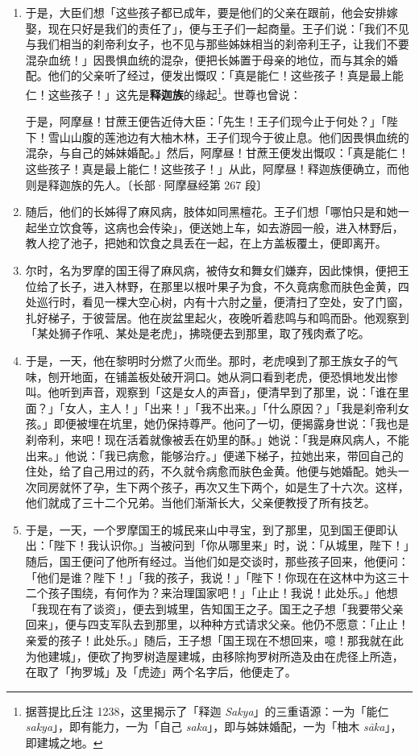\begin{enumerate}
\item 于是，大臣们想「这些孩子都已成年，要是他们的父亲在跟前，他会安排嫁娶，现在只好是我们的责任了」，便与王子们一起商量。王子们说：「我们不见与我们相当的刹帝利女子，也不见与那些姊妹相当的刹帝利王子，让我们不要混杂血统！」因畏惧血统的混杂，便把长姊置于母亲的地位，而与其余的婚配。他们的父亲听了经过，便发出慨叹：「真是能仁！这些孩子！真是最上能仁！这些孩子！」这先是\textbf{释迦族}的缘起\footnote{据菩提比丘注 1238，这里揭示了「释迦 \textit{Sakya}」的三重语源：一为「能仁 \textit{sakya}」，即有能力，一为「自己 \textit{saka}」，即与姊妹婚配，一为「柚木 \textit{sāka}」，即建城之地。}。世尊也曾说：\begin{quoting}于是，阿摩昼！甘蔗王便告近侍大臣：「先生！王子们现今止于何处？」「陛下！雪山山腹的莲池边有大柚木林，王子们现今于彼止息。他们因畏惧血统的混杂，与自己的姊妹婚配。」然后，阿摩昼！甘蔗王便发出慨叹：「真是能仁！这些孩子！真是最上能仁！这些孩子！」从此，阿摩昼！释迦族便确立，而他则是释迦族的先人。{\bluefootnotesize 〔长部·阿摩昼经第 267 段〕}\end{quoting}
\item 随后，他们的长姊得了麻风病，肢体如同黑檀花。王子们想「哪怕只是和她一起坐立饮食等，这病也会传染」，便送她上车，如去游园一般，进入林野后，教人挖了池子，把她和饮食之具丢在一起，在上方盖板覆土，便即离开。
\item 尔时，名为罗摩的国王得了麻风病，被侍女和舞女们嫌弃，因此悚惧，便把王位给了长子，进入林野，在那里以根叶果子为食，不久竟病愈而肤色金黄，四处巡行时，看见一棵大空心树，内有十六肘之量，便清扫了空处，安了门窗，扎好梯子，于彼营居。他在炭盆里起火，夜晚听着悲鸣与和鸣而卧。他观察到「某处狮子作吼、某处是老虎」，拂晓便去到那里，取了残肉煮了吃。
\item 于是，一天，他在黎明时分燃了火而坐。那时，老虎嗅到了那王族女子的气味，刨开地面，在铺盖板处破开洞口。她从洞口看到老虎，便恐惧地发出惨叫。他听到声音，观察到「这是女人的声音」，便清早到了那里，说：「谁在里面？」「女人，主人！」「出来！」「我不出来。」「什么原因？」「我是刹帝利女孩。」即便被埋在坑里，她仍保持尊严。他问了一切，便揭露身世说：「我也是刹帝利，来吧！现在活着就像被丢在奶里的酥。」她说：「我是麻风病人，不能出来。」他说：「我已病愈，能够治疗。」便递下梯子，拉她出来，带回自己的住处，给了自己用过的药，不久就令病愈而肤色金黄。他便与她婚配。她头一次同房就怀了孕，生下两个孩子，再次又生下两个，如是生了十六次。这样，他们就成了三十二个兄弟。当他们渐渐长大，父亲便教授了所有技艺。
\item 于是，一天，一个罗摩国王的城民来山中寻宝，到了那里，见到国王便即认出：「陛下！我认识你。」当被问到「你从哪里来」时，说：「从城里，陛下！」随后，国王便问了他所有经过。当他们如是交谈时，那些孩子回来，他便问：「他们是谁？陛下！」「我的孩子，我说！」「陛下！你现在在这林中为这三十二个孩子围绕，有何作为？来治理国家吧！」「止止！我说！此处乐。」他想「我现在有了谈资」，便去到城里，告知国王之子。国王之子想「我要带父亲回来」，便与四支军队去到那里，以种种方式请求父亲。他仍不愿意：「止止！亲爱的孩子！此处乐。」随后，王子想「国王现在不想回来，噫！那我就在此为他建城」，便砍了拘罗树造屋建城，由移除拘罗树所造及由在虎径上所造，在取了「拘罗城」及「虎迹」两个名字后，他便走了。

\end{enumerate}
